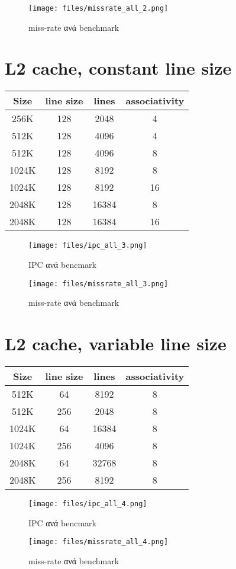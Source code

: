 \documentclass[a4paper,9pt]{article}
\begin{document}
\begin{figure}[H]
    \texttt{[image: files/missrate\_all\_2.png]}
    \caption{miss-rate ανά benchmark}
\end{figure}


\section{L2 cache, constant line size}
\begin{tabular}{c c c c}
    Size & line size & lines & associativity\\ 
    \hline
    \hline
    256K   & 128 & 2048  & 4\\
    \hline
    512K   & 128 & 4096  & 4\\
    512K   & 128 & 4096  & 8\\
    \hline
    1024K  & 128 & 8192  & 8\\
    1024K  & 128 & 8192  & 16\\
    \hline
    2048K  & 128 & 16384 & 8\\
    2048K  & 128 & 16384 & 16\\
\end{tabular}
\begin{figure}[H]
    \texttt{[image: files/ipc\_all\_3.png]}
    \caption{IPC ανά bencmark}
\end{figure}

\begin{figure}[H]
    \texttt{[image: files/missrate\_all\_3.png]}
    \caption{miss-rate ανά benchmark}
\end{figure}

\section{L2 cache, variable line size}
\begin{tabular}{c c c c}
    Size & line size & lines & associativity\\ 
    \hline
    \hline
    512K   & 64  & 8192  & 8\\
    512K   & 256 & 2048  & 8\\
    \hline
    1024K  & 64  & 16384 & 8\\
    1024K  & 256 & 4096  & 8\\
    \hline
    2048K  & 64  & 32768 & 8\\
    2048K  & 256 & 8192  & 8\\
\end{tabular}
\begin{figure}[H]
    \texttt{[image: files/ipc\_all\_4.png]}
    \caption{IPC ανά bencmark}
\end{figure}

\begin{figure}[H]
    \texttt{[image: files/missrate\_all\_4.png]}
    \caption{miss-rate ανά benchmark}
\end{figure}
\end{document}
